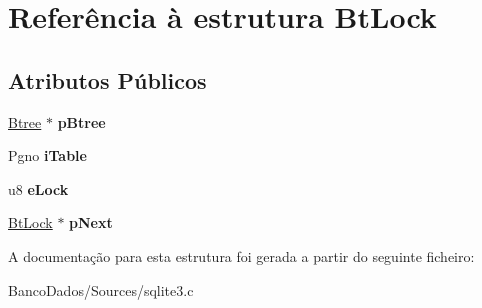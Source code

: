 \hypertarget{struct_bt_lock}{\section{Referência à estrutura Bt\-Lock}
\label{struct_bt_lock}
}
\subsection*{Atributos Públicos}
\begin{DoxyCompactItemize}
\item 
\hypertarget{struct_bt_lock_ab9125b8e79d480b75f3af21cb2ab55c7}{\hyperlink{struct_btree}{Btree} $\ast$ {\bfseries p\-Btree}}\label{struct_bt_lock_ab9125b8e79d480b75f3af21cb2ab55c7}

\item 
\hypertarget{struct_bt_lock_a822efcf018d6c8eb343341cde5df980d}{Pgno {\bfseries i\-Table}}\label{struct_bt_lock_a822efcf018d6c8eb343341cde5df980d}

\item 
\hypertarget{struct_bt_lock_abe07b71018ee423e0d94b5cdba044b5c}{u8 {\bfseries e\-Lock}}\label{struct_bt_lock_abe07b71018ee423e0d94b5cdba044b5c}

\item 
\hypertarget{struct_bt_lock_ad42de86209c7aab43604c52a549b7bca}{\hyperlink{struct_bt_lock}{Bt\-Lock} $\ast$ {\bfseries p\-Next}}\label{struct_bt_lock_ad42de86209c7aab43604c52a549b7bca}

\end{DoxyCompactItemize}


A documentação para esta estrutura foi gerada a partir do seguinte ficheiro\-:\begin{DoxyCompactItemize}
\item 
Banco\-Dados/\-Sources/sqlite3.\-c\end{DoxyCompactItemize}
